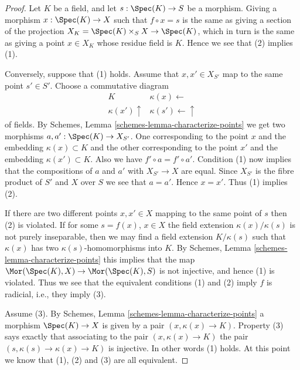 \begin{proof}
Let $K$ be a field, and let $s : \Spec(K) \to S$ be a morphism.
Giving a morphism $x : \Spec(K) \to X$ such that $f \circ x = s$
is the same as giving a section of the projection
$X_K = \Spec(K) \times_S X \to \Spec(K)$, which in turn
is the same as giving a point $x \in X_K$ whose residue field is $K$.
Hence we see that (2) implies (1).

\medskip\noindent
Conversely, suppose that (1) holds. Assume that $x, x' \in X_{S'}$
map to the same point $s' \in S'$. Choose a commutative diagram
$$
\begin{array}{cc}K & \kappa(x) \longleftarrow \\ \kappa(x') \uparrow & \kappa(s') \longleftarrow\uparrow\end{array}
$$
of fields. By Schemes, Lemma \ref{schemes-lemma-characterize-points}
we get two morphisms $a, a' : \Spec(K) \to X_{S'}$. One corresponding
to the point $x$ and the embedding $\kappa(x) \subset K$ and
the other corresponding to the  point $x'$ and the embedding
$\kappa(x') \subset K$. Also we have $f' \circ a = f' \circ a'$.
Condition (1) now implies that the compositions of $a$ and $a'$ with
$X_{S'} \to X$ are equal. Since $X_{S'}$ is the fibre product
of $S'$ and $X$ over $S$ we see that $a = a'$. Hence $x = x'$.
Thus (1) implies (2).

\medskip\noindent
If there are two different points $x, x' \in X$ mapping to the same point of $s$
then (2) is violated.
If for some $s = f(x)$, $x \in X$ the field extension
$\kappa(x)/\kappa(s)$ is not purely inseparable, then
we may find a field extension $K/\kappa(s)$ such that
$\kappa(x)$ has two $\kappa(s)$-homomorphisms into $K$. By
Schemes, Lemma \ref{schemes-lemma-characterize-points} this
implies that the map
$\Mor(\Spec(K), X) \to \Mor(\Spec(K), S)$
is not injective, and hence (1) is violated.
Thus we see that the equivalent conditions (1) and (2) imply
$f$ is radicial, i.e., they imply (3).

\medskip\noindent
Assume (3). By
Schemes, Lemma \ref{schemes-lemma-characterize-points}
a morphism $\Spec(K) \to X$ is given by a pair $(x, \kappa(x) \to K)$.
Property (3) says exactly that associating to the pair
$(x, \kappa(x) \to K)$ the pair $(s, \kappa(s) \to \kappa(x) \to K)$
is injective. In other words (1) holds. At this point we know that
(1), (2) and (3) are all equivalent.


\end{proof}
